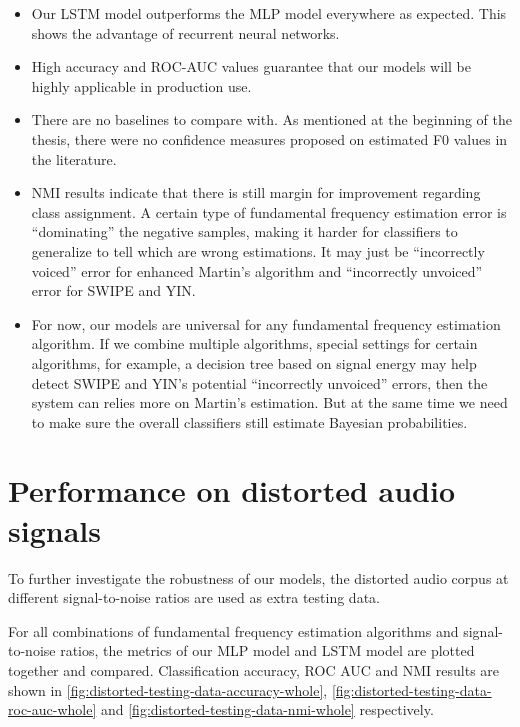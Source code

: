 \documentclass[11pt,a4paper]{report}
\begin{document}
\begin{itemize}
  \item Our LSTM model outperforms the MLP model everywhere as expected.
    This shows the advantage of recurrent neural networks.
  \item High accuracy and ROC-AUC values guarantee that our models will be highly applicable in production use.
  \item There are no baselines to compare with.
    As mentioned at the beginning of the thesis, there were no confidence measures proposed on estimated F0 values in the literature.

  \bigskip

  \item NMI results indicate that there is still margin for improvement regarding class assignment.
    A certain type of fundamental frequency estimation error is \enquote{dominating} the negative samples, making it harder for classifiers to generalize to tell which are wrong estimations.
    It may just be \enquote{incorrectly voiced} error for enhanced Martin's algorithm and \enquote{incorrectly unvoiced} error for SWIPE and YIN.
  \item For now, our models are universal for any fundamental frequency estimation algorithm.
    If we combine multiple algorithms, special settings for certain algorithms, for example, a decision tree based on signal energy may help detect SWIPE and YIN's potential \enquote{incorrectly unvoiced} errors, then the system can relies more on Martin's estimation.
    But at the same time we need to make sure the overall classifiers still estimate Bayesian probabilities.
\end{itemize}

\newpage

\section{Performance on distorted audio signals}

To further investigate the robustness of our models, the distorted audio corpus at different signal-to-noise ratios are used as extra testing data.

For all combinations of fundamental frequency estimation algorithms and signal-to-noise ratios, the metrics of our MLP model and LSTM model are plotted together and compared.
Classification accuracy, ROC AUC and NMI results are shown in \autoref{fig:distorted-testing-data-accuracy-whole}, \autoref{fig:distorted-testing-data-roc-auc-whole} and \autoref{fig:distorted-testing-data-nmi-whole} respectively.
\end{document}
